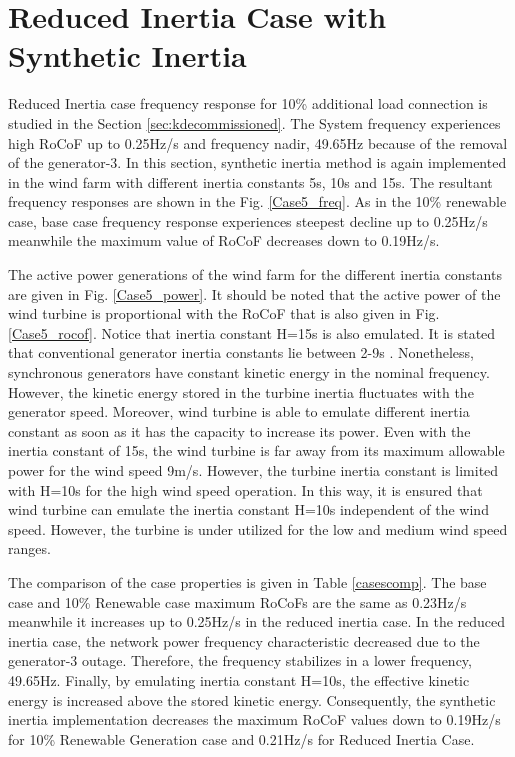 \section{Reduced Inertia Case with Synthetic Inertia}
Reduced Inertia case frequency response for 10\% additional load connection is studied in the Section \ref{sec:kdecommissioned}. The System frequency experiences high RoCoF up to 0.25Hz/s and frequency nadir, 49.65Hz because of the removal of the generator-3. In this section, synthetic inertia method is again implemented in the wind farm with different inertia constants 5s, 10s and 15s. The resultant frequency responses are shown in the Fig. \ref{Case5_freq}. As in the 10\% renewable case, base case frequency response experiences steepest decline up to 0.25Hz/s meanwhile the maximum value of RoCoF decreases down to 0.19Hz/s. \par
The active power generations of the wind farm for the different inertia constants are given in Fig. \ref{Case5_power}. It should be noted that the active power of the wind turbine is proportional with the RoCoF that is also given in Fig. \ref{Case5_rocof}. Notice that inertia constant H=15s is also emulated. It is stated that conventional generator inertia constants lie between 2-9s \cite{Kundur}. Nonetheless, synchronous generators have constant kinetic energy in the nominal frequency. However, the kinetic energy stored in the turbine inertia fluctuates with the generator speed. Moreover, wind turbine is able to emulate different inertia constant as soon as it has the capacity to increase its power. Even with the inertia constant of 15s, the wind turbine is far away from its maximum allowable power for the wind speed 9m/s. However, the turbine inertia constant is limited with H=10s for the high wind speed operation. In this way, it is ensured that wind turbine can emulate the inertia constant H=10s independent of the wind speed. However, the turbine is under utilized for the low and medium wind speed ranges.\par
The comparison of the case properties is given in Table \ref{casescomp}. The base case and 10\% Renewable case maximum RoCoFs are the same as 0.23Hz/s meanwhile it increases up to 0.25Hz/s in the reduced inertia case. In the reduced inertia case, the network power frequency characteristic decreased due to the generator-3 outage. Therefore, the frequency stabilizes in a lower frequency, 49.65Hz. Finally, by emulating inertia constant H=10s, the effective kinetic energy is increased above the stored kinetic energy. Consequently, the synthetic inertia implementation decreases the maximum RoCoF values down to 0.19Hz/s for 10\% Renewable Generation case and 0.21Hz/s for Reduced Inertia Case.
